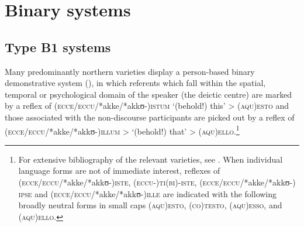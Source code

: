 \documentclass[output=paper]{langsci/langscibook}
\begin{document}
\section{Binary systems}\label{bkm:Ref370483093}

\subsection{Type B1 systems}\label{bkm:Ref370487730}

Many predominantly northern  varieties display a person-based binary
demonstrative system (), in which referents which fall
within the spatial, temporal or psychological domain of the speaker (the
deictic centre) are marked by a reflex of
\textsc{(ecce/eccu/}*akke\textsc{/*}akkʊ-\textsc{)istum} ‘(behold!) this’ >
(\textsc{aqu)e\-sto} and those associated with the non-discourse participants are
picked out by a reflex of
\textsc{(ecce/eccu/}*akke\textsc{/*}akkʊ\nobreakdash-\textsc{)illum} >
‘(behold!) that’ > \textsc{(aqu)ello}.\footnote{For extensive bibliography of
    the relevant varieties, see \citet[879]{Ledgeway:2016ab}. When individual
    language forms are not of immediate interest, reflexes of
    (\textsc{ecce/eccu/*}akke/\mbox{*akkʊ-)}\textsc{iste},
    (\textsc{eccu-)ti(bi)-iste}, \textsc{(ecce/eccu/*}akke/*akkʊ-)\textsc{%
    ipse} and \textsc{(ecce/eccu/*}akke/*akkʊ-)\textsc{ille} are indicated with
    the following broadly neutral  forms in small caps
    (\textsc{aqu)esto,} \textsc{(co)testo,} \textsc{(aqu)esso}, and
\textsc{(aqu)ello}.}
\end{document}
